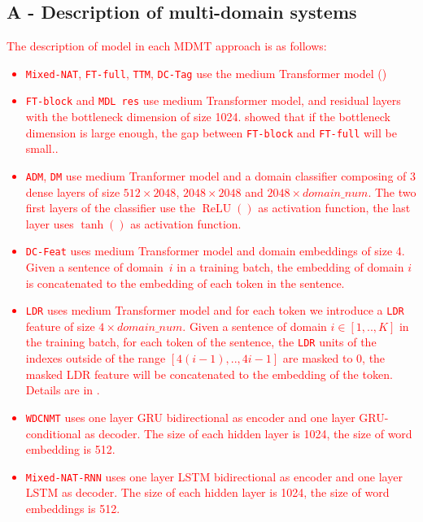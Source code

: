 \documentclass[11pt,a4paper]{article}
\newcommand{\fyTodo}[1]{\Todo[FY:]{\textcolor{orange}{#1}}}
\newcommand{\revision}[1]{\textcolor{red}{#1}}
\newcommand{\system}[1]{\texttt{{#1}}}
\begin{document}
\subsection*{A - Description of multi-domain systems \label{ssec:implementation-details}}
\revision{%
The description of model in each MDMT approach is as follows:
\begin{itemize}
\item \system{Mixed-NAT}, \system{FT-full}, \system{TTM}, \system{DC-Tag} use the medium Transformer model (\fyTodo{ref})
\item \system{FT-block} and \system{MDL res} use medium Transformer model, and residual layers with the bottleneck dimension of size 1024. \cite{Bapna19simple} showed that if the bottleneck dimension is large enough, the gap between \system{FT-block} and \system{FT-full} will be small.\fyTodo{This comment is confusing}.
\item \system{ADM}, \system{DM} use medium Tranformer model and a domain classifier composing of 3 dense layers of size $512 \times 2048$, $2048 \times 2048$ and $2048 \times domain\_num$. The two first layers of the classifier use the $\operatorname{ReLU}()$ as activation function, the last layer uses $\tanh()$ as activation function.
\item \system{DC-Feat} uses medium Transformer model and domain embeddings of size 4. Given a sentence of domain~$i$ in a training batch, the embedding of domain $i$ is concatenated to the embedding of each token in the sentence.
\item \system{LDR} uses medium Transformer model and for each token we introduce a \system{LDR} feature of size $4 \times domain\_num$. Given a sentence of domain $i\in[1,..,K]$ in the training batch, for each token of the sentence, the \system{LDR} units of the indexes outside of the range $[4(i-1),..,4i-1]$ are masked to 0, the masked LDR feature will be concatenated to the embedding of the token. Details are in \cite{Pham19generic}.
\item \system{WDCNMT} uses one layer GRU bidirectional as encoder and one layer GRU-conditional as decoder. The size of each hidden layer is 1024, the size of word embedding is 512.
\item \system{Mixed-NAT-RNN} uses one layer LSTM bidirectional as encoder and one layer LSTM as decoder. The size of each hidden layer is 1024, the size of word embeddings is 512. 
\end{itemize}
}
\end{document}
